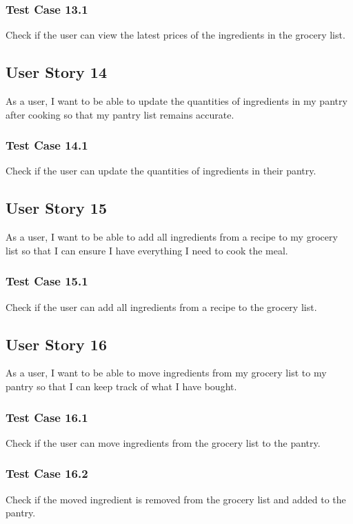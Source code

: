 \documentclass[11pt, letterpaper]{report}
\begin{document}
\subsubsection{Test Case 13.1}
Check if the user can view the latest prices of the ingredients in the grocery list.

\subsection{User Story 14}
As a user, I want to be able to update the quantities of ingredients in my pantry after cooking so that my pantry list remains accurate.

\subsubsection{Test Case 14.1}
Check if the user can update the quantities of ingredients in their pantry.

\subsection{User Story 15}
As a user, I want to be able to add all ingredients from a recipe to my grocery list so that I can ensure I have everything I need to cook the meal.

\subsubsection{Test Case 15.1}
Check if the user can add all ingredients from a recipe to the grocery list.

\subsection{User Story 16}
As a user, I want to be able to move ingredients from my grocery list to my pantry so that I can keep track of what I have bought.

\subsubsection{Test Case 16.1}
Check if the user can move ingredients from the grocery list to the pantry.

\subsubsection{Test Case 16.2}
Check if the moved ingredient is removed from the grocery list and added to the pantry.
\end{document}
